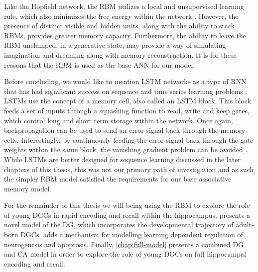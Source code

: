 Like the Hopfield network, the \ac{RBM} utilizes a local and unsupervised learning rule, which also 
minimizes the free energy within the network \citep{hopfield-rbm-similarities}. 
However, the presence of distinct visible and hidden 
units, along with the ability to stack \acp{RBM}, provides greater memory capacity. 
Furthermore, the ability to leave the \ac{RBM} unclamped, in a generative state, may provide a way of 
simulating imagination and dreaming along with memory reconstruction. 
It is for these reasons that the \ac{RBM} is used as the base \ac{ANN} for our model.

Before concluding, we would like to mention \ac{LSTM} networks as a type of \ac{RNN} 
that has had significant success on sequence and time series learning problems
\citep{lstm-sequence,lstm-timeseries}.
\Acp{LSTM} use the concept of a memory cell, also called an \ac{LSTM} block. 
This block feeds a set of inputs through a squashing function 
to read, write and keep gates, which control long and short term storage within the network. 
Once again, backpropagation can be used to send an error signal back 
through the memory cells.
Interestingly, by continuously feeding the error 
signal back through the gate weights within the same block, the vanishing 
gradient problem can be avoided \citep{lstm-orig}. 
While \acp{LSTM} are better designed for 
sequence learning discussed in the later chapters of this thesis, this was not our primary path of 
investigation and as such the simpler \ac{RBM} model satisfied the requirements for our base 
associative memory model.

For the remainder of this thesis we will being using the \ac{RBM} to explore 
the role of young \acp{DGC} in rapid encoding and recall within the hippocampus.
 presents a novel model of the \ac{DG}, which incorporates 
the developmental trajectory of adult-born \acp{DGC}. 
adds a mechanism for modelling learning dependent regulation of neurogenesis and 
apoptosis. 
Finally, \cref{chap:full-model} presents a combined \ac{DG} and CA model 
in order to explore the role of young \acp{DGC} on full hippocampal encoding and recall.


